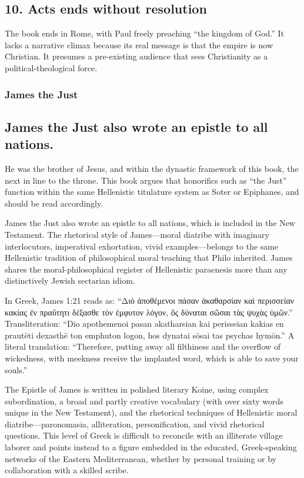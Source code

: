 \subsection{10.
Acts ends without resolution}\label{subsec:acts-ends-without-resolution}

The book ends in Rome, with Paul freely preaching ``the kingdom of God.''
It lacks a narrative climax because its real message is that the empire is now Christian.
It presumes a pre-existing audience that sees Christianity as a political-theological force.

\subsubsection{James the Just}\label{subsec:james-the-just}

\subsection{James the Just also wrote an epistle to all nations.}\label{subsec:james-the-just-also-wrote-an-epistle-to-all-nations.}

He was the brother of Jesus, and within the dynastic framework of this book, the next in line to the throne.
This book argues that honorifics such as ``the Just'' function within the same Hellenistic titulature system as Soter or Epiphanes, and should be read accordingly.

James the Just also wrote an epistle to all nations, which is included in the New Testament.
The rhetorical style of James---moral diatribe with imaginary interlocutors, imperatival exhortation, vivid examples---belongs to the same Hellenistic tradition of philosophical moral teaching that Philo inherited.
James shares the moral-philosophical register of Hellenistic paraenesis more than any distinctively Jewish sectarian idiom.

In Greek, James 1:21 reads as:
``Διὸ ἀποθέμενοι πάσαν ἀκαθαρσίαν καὶ περισσείαν κακίας ἐν πραΰτητι δέξασθε τὸν ἐμφυτον λόγον, ὃς δύναται σῶσαι τὰς ψυχὰς ὑμῶν.''
Transliteration: ``Dio apothemenoi pasan akatharsian kai perisseian kakias en prautēti dexasthē ton emphuton logon, hos dynatai sōsai tas psychas hymōn.''
A literal translation: ``Therefore, putting away all filthiness and the overflow of wickedness, with meekness receive the implanted word, which is able to save your souls.''

The Epistle of James is written in polished literary Koine, using complex subordination, a broad and partly creative vocabulary (with over sixty words unique in the New Testament), and the rhetorical techniques of Hellenistic moral diatribe---paronomasia, alliteration, personification, and vivid rhetorical questions.
This level of Greek is difficult to reconcile with an illiterate village laborer and points instead to a figure embedded in the educated, Greek-speaking networks of the Eastern Mediterranean, whether by personal training or by collaboration with a skilled scribe.

